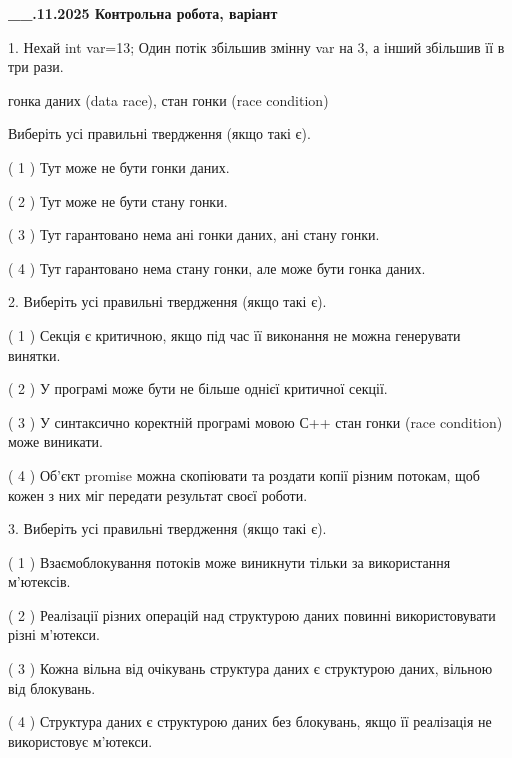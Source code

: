 \documentclass[12pt, ukrainian]{article}
\begin{document}
\newpage
\begin {large}

\textbf{\_\_.11.2025 Контрольна робота, варіант  }\par


{
1. Нехай int var=13; Один потік збільшив змінну var на 3, а інший збільшив її в три рази.

гонка даних (data race), стан гонки (race condition)

Виберіть усі правильні твердження (якщо такі є).\par
\vspace{2mm}
( 1 ) Тут може не бути гонки даних.%

( 2 ) Тут може не бути стану гонки.%

( 3 ) Тут гарантовано нема ані гонки даних, ані стану гонки.%

( 4 ) Тут гарантовано нема стану гонки, але може бути гонка даних.%


2. Виберіть усі правильні твердження (якщо такі є).\par
\vspace{2mm}

( 1 ) Секція є критичною, якщо під час її виконання не можна генерувати винятки.%

( 2 ) У програмі може бути не більше однієї критичної секції.%

( 3 ) У синтаксично коректній програмі мовою С++ стан гонки (race condition) може виникати.%

( 4 ) Об’єкт promise можна скопіювати та роздати копії різним потокам, щоб кожен з них міг передати результат своєї роботи.%


3. Виберіть усі правильні твердження (якщо такі є).\par
\vspace{2mm}

( 1 ) Взаємоблокування потоків може виникнути тільки за використання м’ютексів.%

( 2 ) Реалізації різних операцій над структурою даних повинні використовувати різні м’ютекси.%

( 3 ) Кожна вільна від очікувань структура даних є структурою даних, вільною від блокувань.%

( 4 ) Структура даних є структурою даних без блокувань, якщо її реалізація не використовує м’ютекси.%


}
\end{large}
\end{document}
